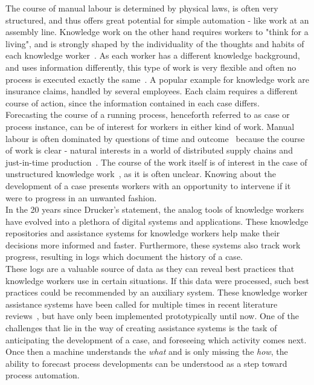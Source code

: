 The course of manual labour is determined by physical laws, is often very structured, and thus offers great potential for simple automation - like work at an assembly line. Knowledge work on the other hand requires workers to "think for a living", and is strongly shaped by the individuality of the thoughts and habits of each knowledge worker~\cite{drucker1999}. As each worker has a different knowledge background, and uses information differently, this type of work is very flexible and often no process is executed exactly the same~\cite{hewelt2016}. A popular example for knowledge work are insurance claims, handled by several employees. Each claim requires a different course of action, since the information contained in each case differs.\\

Forecasting the course of a running process, henceforth referred to as case or process instance, can be of interest for workers in either kind of work. Manual labour is often dominated by questions of time and outcome~\cite{rogge2013} because the course of work is clear - natural interests in a world of distributed supply chains and just-in-time production~\cite{web:economist:jit}. The course of the work itself is of interest in the case of unstructured knowledge work~\cite{francescomarino2015}, as it is often unclear. Knowing about the development of a case presents workers with an opportunity to intervene if it were to progress in an unwanted fashion.\\

In the 20 years since Drucker's statement, the analog tools of knowledge workers have evolved into a plethora of digital systems and applications. These knowledge repositories and assistance systems for knowledge workers help make their decisions more informed and faster. Furthermore, these systems also track work progress, resulting in logs which document the history of a case.\\

These logs are a valuable source of data as they can reveal best practices that knowledge workers use in certain situations. If this data were processed, such best practices could be recommended by an auxiliary system. These knowledge worker assistance systems have been called for multiple times in recent literature reviews~\cite{hauder2014, francescomarino2018}, but have only been implemented prototypically until now. One of the challenges that lie in the way of creating assistance systems is the task of anticipating the development of a case, and foreseeing which activity comes next. Once then a machine understands the \textit{what} and is only missing the \textit{how}, the ability to forecast process developments can be understood as a step toward process automation.\\

